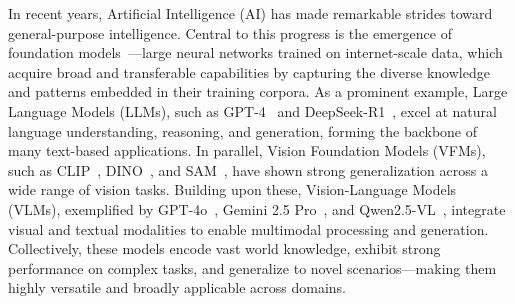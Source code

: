 \documentclass[10pt, a4paper, logo, copyright]{googledeepmind} %
\begin{document}
In recent years, Artificial Intelligence (AI) has made remarkable strides toward general-purpose intelligence. Central to this progress is the emergence of foundation models~\cite{bommasani2021opportunities, zhou2024comprehensive}---large neural networks trained on internet-scale data, which acquire broad and transferable capabilities by capturing the diverse knowledge and patterns embedded in their training corpora. 
As a prominent example, Large Language Models (LLMs), such as GPT-4~\cite{achiam2023gpt} and DeepSeek-R1~\cite{guo2025deepseek}, excel at natural language understanding, reasoning, and generation, forming the backbone of many text-based applications. In parallel, Vision Foundation Models (VFMs), such as CLIP~\cite{radford2021learning}, DINO~\cite{caron2021emerging, oquab2023dinov2}, and SAM~\cite{kirillov2023segment, ravi2024sam}, have shown strong generalization across a wide range of vision tasks. Building upon these, Vision-Language Models (VLMs), exemplified by GPT-4o~\cite{openai2024gpt4ocard}, Gemini 2.5 Pro~\cite{gemini25}, and Qwen2.5-VL~\cite{bai2025qwen2}, integrate visual and textual modalities to enable multimodal processing and generation. 
Collectively, these models encode vast world knowledge, exhibit strong performance on complex tasks, and generalize to novel scenarios---making them highly versatile and broadly applicable across domains.
\end{document}
